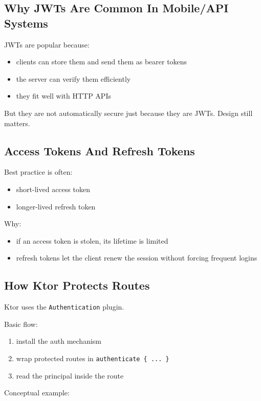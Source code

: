 \documentclass[11pt,a4paper]{article}
\begin{document}
\subsection{Why JWTs Are Common In Mobile/API Systems}

JWTs are popular because:
\begin{itemize}
    \item clients can store them and send them as bearer tokens
    \item the server can verify them efficiently
    \item they fit well with HTTP APIs
\end{itemize}

But they are not automatically secure just because they are JWTs. Design still matters.

\subsection{Access Tokens And Refresh Tokens}

Best practice is often:
\begin{itemize}
    \item short-lived access token
    \item longer-lived refresh token
\end{itemize}

Why:
\begin{itemize}
    \item if an access token is stolen, its lifetime is limited
    \item refresh tokens let the client renew the session without forcing frequent logins
\end{itemize}

\subsection{How Ktor Protects Routes}

Ktor uses the \texttt{Authentication} plugin.

Basic flow:
\begin{enumerate}
    \item install the auth mechanism
    \item wrap protected routes in \texttt{authenticate \{ ... \}}
    \item read the principal inside the route
\end{enumerate}

Conceptual example:
\end{document}
